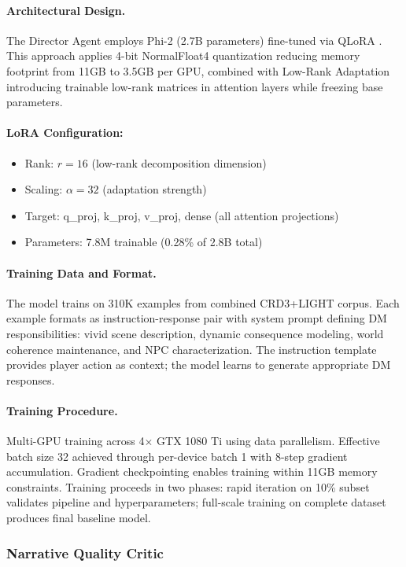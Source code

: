 \documentclass[11pt]{article}
\begin{document}
\paragraph{Architectural Design.} The Director Agent employs Phi-2 (2.7B parameters) fine-tuned via QLoRA \cite{dettmers2023qlora}. This approach applies 4-bit NormalFloat4 quantization reducing memory footprint from 11GB to 3.5GB per GPU, combined with Low-Rank Adaptation introducing trainable low-rank matrices in attention layers while freezing base parameters.

\paragraph{LoRA Configuration:}
\begin{itemize}
\item Rank: $r=16$ (low-rank decomposition dimension)
\item Scaling: $\alpha=32$ (adaptation strength)
\item Target: q\_proj, k\_proj, v\_proj, dense (all attention projections)
\item Parameters: 7.8M trainable (0.28\% of 2.8B total)
\end{itemize}

\paragraph{Training Data and Format.} The model trains on 310K examples from combined CRD3+LIGHT corpus. Each example formats as instruction-response pair with system prompt defining DM responsibilities: vivid scene description, dynamic consequence modeling, world coherence maintenance, and NPC characterization. The instruction template provides player action as context; the model learns to generate appropriate DM responses.

\paragraph{Training Procedure.} Multi-GPU training across 4$\times$ GTX 1080 Ti using data parallelism. Effective batch size 32 achieved through per-device batch 1 with 8-step gradient accumulation. Gradient checkpointing enables training within 11GB memory constraints. Training proceeds in two phases: rapid iteration on 10\% subset validates pipeline and hyperparameters; full-scale training on complete dataset produces final baseline model.

\subsubsection{Narrative Quality Critic}
\end{document}
